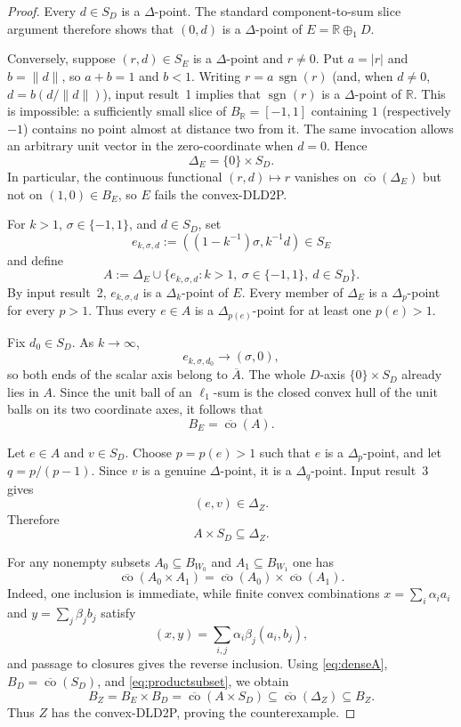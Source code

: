 \documentclass[11pt]{article}
\newcommand{\clco}{\overline{\operatorname{co}}}
\newcommand{\R}{\mathbb{R}}
\begin{document}
\begin{proof}
Every $d\in S_D$ is a $\Delta$-point.  The standard component-to-sum slice
argument therefore shows that $(0,d)$ is a $\Delta$-point of
$E=\R\oplus_1D$.

Conversely, suppose $(r,d)\in S_E$ is a $\Delta$-point and $r\neq0$.  Put
$a=|r|$ and $b=\|d\|$, so $a+b=1$ and $b<1$.  Writing
$r=a\,\operatorname{sgn}(r)$ (and, when $d\neq0$, $d=b(d/\|d\|)$), input
result~1 implies that $\operatorname{sgn}(r)$ is a $\Delta$-point of $\R$.
This is impossible: a sufficiently small slice of $B_\R=[-1,1]$ containing
$1$ (respectively $-1$) contains no point almost at distance two from it.
The same invocation allows an arbitrary unit vector in the zero-coordinate
when $d=0$.  Hence
\[
 \Delta_E=\{0\}\times S_D.
\]
In particular, the continuous functional $(r,d)\mapsto r$ vanishes on
$\clco(\Delta_E)$ but not on $(1,0)\in B_E$, so $E$ fails the convex-DLD2P.

For $k>1$, $\sigma\in\{-1,1\}$, and $d\in S_D$, set
\[
 e_{k,\sigma,d}:=\left((1-k^{-1})\sigma,k^{-1}d\right)\in S_E
\]
and define
\[
 A:=\Delta_E\cup
 \{e_{k,\sigma,d}:k>1,\ \sigma\in\{-1,1\},\ d\in S_D\}.
\]
By input result~2, $e_{k,\sigma,d}$ is a $\Delta_k$-point of $E$.  Every
member of $\Delta_E$ is a $\Delta_p$-point for every $p>1$.  Thus every
$e\in A$ is a $\Delta_{p(e)}$-point for at least one $p(e)>1$.

Fix $d_0\in S_D$.  As $k\to\infty$,
\[
 e_{k,\sigma,d_0}\longrightarrow(\sigma,0),
\]
so both ends of the scalar axis belong to $\overline A$.  The whole $D$-axis
$\{0\}\times S_D$ already lies in $A$.  Since the unit ball of an
$\ell_1$-sum is the closed convex hull of the unit balls on its two coordinate
axes, it follows that
\begin{equation}\label{eq:denseA}
 B_E=\clco(A).
\end{equation}

Let $e\in A$ and $v\in S_D$.  Choose $p=p(e)>1$ such that $e$ is a
$\Delta_p$-point, and let $q=p/(p-1)$.  Since $v$ is a genuine $\Delta$-point,
it is a $\Delta_q$-point.  Input result~3 gives
\[
 (e,v)\in\Delta_Z.
\]
Therefore
\begin{equation}\label{eq:productsubset}
 A\times S_D\subseteq\Delta_Z.
\end{equation}

For any nonempty subsets $A_0\subseteq B_{W_0}$ and
$A_1\subseteq B_{W_1}$ one has
\[
 \clco(A_0\times A_1)=\clco(A_0)\times\clco(A_1).
\]
Indeed, one inclusion is immediate, while finite convex combinations
$x=\sum_i\alpha_i a_i$ and $y=\sum_j\beta_j b_j$ satisfy
\[
 (x,y)=\sum_{i,j}\alpha_i\beta_j(a_i,b_j),
\]
and passage to closures gives the reverse inclusion.  Using
\eqref{eq:denseA}, $B_D=\clco(S_D)$, and \eqref{eq:productsubset}, we obtain
\[
 B_Z=B_E\times B_D
 =\clco(A\times S_D)
 \subseteq\clco(\Delta_Z)
 \subseteq B_Z.
\]
Thus $Z$ has the convex-DLD2P, proving the counterexample.


\end{proof}
\end{document}
